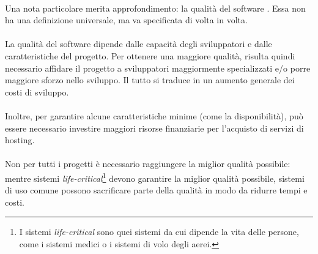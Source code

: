 \documentclass[11pt,a4paper,english]{article}
\begin{document}
\paragraph{} Una nota particolare merita approfondimento: la qualità del software \cite{quality}. Essa non ha una definizione universale, ma va specificata di volta in volta.

\paragraph{} La qualità del software dipende dalle capacità degli sviluppatori e dalle caratteristiche del progetto. Per ottenere una maggiore qualità, risulta quindi necessario affidare il progetto a sviluppatori maggiormente specializzati e/o porre maggiore sforzo nello sviluppo. Il tutto si traduce in un aumento generale dei costi di sviluppo. 

\paragraph{} Inoltre, per garantire alcune caratteristiche minime (come la disponibilità), può essere necessario investire maggiori risorse finanziarie per l'acquisto di servizi di hosting.

\paragraph{} Non per tutti i progetti è necessario raggiungere la miglior qualità possibile: mentre sistemi \emph{life-critical}\footnote{I sistemi \emph{life-critical} sono quei sistemi da cui dipende la vita delle persone, come i sistemi medici o i sistemi di volo degli aerei.} devono garantire la miglior qualità possibile, sistemi di uso comune possono sacrificare parte della qualità in modo da ridurre tempi e costi. 
\end{document}
